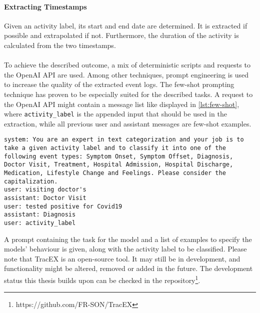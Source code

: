 \paragraph{Extracting Timestamps} Given an activity label, its start and end date are determined. It is extracted if possible and extrapolated if not. Furthermore, the duration of the activity is calculated from the two timestamps.\\\\
To achieve the described outcome, a mix of deterministic scripts and requests to the OpenAI API are used. Among other techniques, prompt engineering is used to increase the quality of the extracted event logs.
The few-shot prompting technique has proven to be especially suited for the described tasks. A request to the OpenAI API might contain a message list like displayed in \autoref{lst:few-shot}, where \verb|activity_label| is the appended input that should be used in the extraction, while all previous user and assistant messages are few-shot examples.
\begin{lstlisting}[language=prompt, caption={Few-shot prompt to categorize activities into event types}, label={lst:few-shot}]
system: You are an expert in text categorization and your job is to take a given activity label and to classify it into one of the following event types: Symptom Onset, Symptom Offset, Diagnosis, Doctor Visit, Treatment, Hospital Admission, Hospital Discharge, Medication, Lifestyle Change and Feelings. Please consider the capitalization.  
user: visiting doctor's 
assistant: Doctor Visit  
user: tested positive for Covid19
assistant: Diagnosis
user: activity_label  
\end{lstlisting}
A prompt containing the task for the model and a list of examples to specify the models' behaviour is given, along with the activity label to be classified.
Please note that TracEX is an open-source tool. It may still be in development, and functionality might be altered, removed or added in the future. The development status this thesis builds upon can be checked in the repository\footnote{https://github.com/FR-SON/TracEX}.
